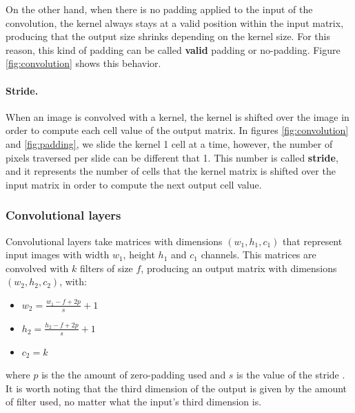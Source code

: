 On the other hand, when there is no padding applied to the input of the convolution, the kernel always stays at a valid position within the input matrix, producing that the output size shrinks depending on the kernel size. For this reason, this kind of padding can be called \textbf{valid} padding or no-padding. Figure \ref{fig:convolution} shows this behavior.

\paragraph{Stride.}
When an image is convolved with a kernel, the kernel is shifted over the image in order to compute each cell value of the output matrix. In figures \ref{fig:convolution} and \ref{fig:padding}, we slide the kernel 1 cell at a time, however, the number of pixels traversed per slide can be different that 1. This number is called \textbf{stride}, and it represents the number of cells that the kernel matrix is shifted over the input matrix in order to compute the next output cell value.

\subsubsection*{Convolutional layers}
Convolutional layers take matrices with dimensions $(w_1, h_1, c_1)$ that represent input images with width $w_1$, height $h_1$ and $c_1$ channels. This matrices are convolved with $k$ filters of size $f$, producing an output matrix with dimensions $(w_2, h_2, c_2)$, with:

\begin{itemize}
	\item $w_2 = \frac{w_1 - f + 2p}{s} + 1$
	\item $h_2 = \frac{h_2 - f + 2p}{s} + 1$
	\item $c_2 = k$
\end{itemize}
where $p$ is the the amount of zero-padding used and $s$ is the value of the stride \cite{STANFORD}. It is worth noting that the third dimension of the output is given by the amount of filter used, no matter what the input's third dimension is.

